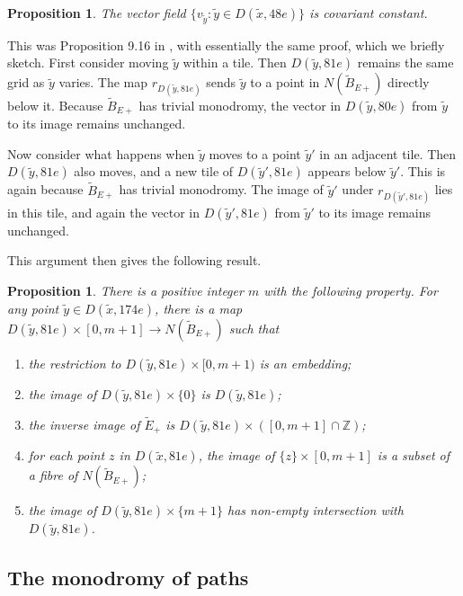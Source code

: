 \documentclass[oneside]{amsart}
\numberwithin{equation}{section}
\theoremstyle{plain}
\newtheorem{proposition}[equation]{Proposition}
\theoremstyle{definition}
\begin{document}
\begin{proposition}
\label{Prop:CovariantConstant}
The vector field $\{ v_{\tilde y} : \tilde y \in D(\tilde x, 48e) \}$ is covariant constant.
\end{proposition}

This was Proposition 9.16 in \cite{Lackenby:PolyUnknot}, with essentially the same proof, which we briefly sketch.
First consider moving $\tilde y$ within a tile. Then $D({\tilde y, 81e})$ remains the same grid as $\tilde y$ varies.
The map $r_{D(\tilde y,81e)}$ sends $\tilde y$ to a point in $N(\tilde B_{E+})$ directly below it.
Because $\tilde B_{E+}$ has trivial monodromy, the vector in $D({\tilde y, 80e})$ from $\tilde y$
to its image remains unchanged.

Now consider what happens when $\tilde y$ moves to a point $\tilde y'$ in an adjacent tile. Then $D({\tilde y, 81e})$ also moves,
and a new tile of $D({\tilde y', 81e})$ appears below $\tilde y'$. This is again because $\tilde B_{E+}$ has trivial monodromy.
The image of $\tilde y'$ under $r_{D(\tilde y',81e)}$ lies in this tile, and again the vector in $D({\tilde y', 81e})$ from $\tilde y'$
to its image remains unchanged.

This argument then gives the following result.

\begin{proposition}
\label{Prop:ProductRegion}
There is a positive integer $m$ with the following property. For any point $\tilde y \in D(\tilde x, 174e)$,
there is a map
$D(\tilde y, 81e) \times [0,m+1] \rightarrow N(\tilde B_{E+})$ such that
\begin{enumerate}
\item the restriction to $D(\tilde y, 81e) \times [0,m+1)$ is an embedding;
\item the image of $D(\tilde y, 81e) \times \{ 0 \}$ is $D(\tilde y, 81e)$;
\item the inverse image of $\tilde E_+$ is $D(\tilde y, 81e) \times ([0,m+1] \cap \mathbb{Z})$;
\item for each point $z$ in $D(\tilde x, 81e)$, the image of $\{ z \} \times [0,m+1]$ is a subset of
a fibre of $N(\tilde B_{E+})$;
\item the image of $D(\tilde y, 81e) \times \{ m+1 \}$ has non-empty intersection with $D(\tilde y, 81e)$.
\end{enumerate}
\end{proposition}

\subsection{The monodromy of paths}
\end{document}
